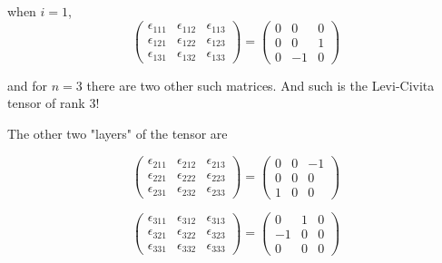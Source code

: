 when $i=1$,
$$
\begin{pmatrix}
\epsilon_{111} & \epsilon_{112} & \epsilon_{113} \\
\epsilon_{121} & \epsilon_{122} & \epsilon_{123} \\
\epsilon_{131} & \epsilon_{132} & \epsilon_{133}
\end{pmatrix}
=
\begin{pmatrix}
0 & 0 & 0 \\
0 & 0 & 1 \\
0 & -1 & 0
\end{pmatrix}
$$

and for $n=3$ there are two other such matrices.
And such is the Levi-Civita tensor of rank 3!

The other two "layers" of the tensor are

$$
\begin{pmatrix}
\epsilon_{211} & \epsilon_{212} & \epsilon_{213} \\
\epsilon_{221} & \epsilon_{222} & \epsilon_{223} \\
\epsilon_{231} & \epsilon_{232} & \epsilon_{233}
\end{pmatrix}
=
\begin{pmatrix}
0 & 0 & -1 \\
0 & 0 & 0 \\
1 & 0 & 0
\end{pmatrix}
$$

$$
\begin{pmatrix}
\epsilon_{311} & \epsilon_{312} & \epsilon_{313} \\
\epsilon_{321} & \epsilon_{322} & \epsilon_{323} \\
\epsilon_{331} & \epsilon_{332} & \epsilon_{333}
\end{pmatrix}
=
\begin{pmatrix}
0 & 1 & 0 \\
-1 & 0 & 0 \\
0 & 0 & 0
\end{pmatrix}
$$